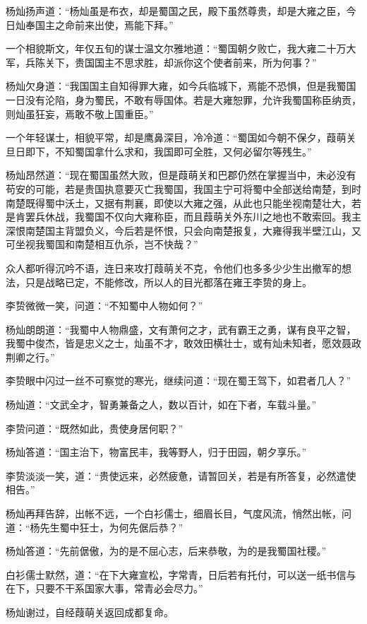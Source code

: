 杨灿扬声道：“杨灿虽是布衣，却是蜀国之民，殿下虽然尊贵，却是大雍之臣，今日灿奉国主之命前来出使，焉能下拜。”

一个相貌斯文，年仅五旬的谋士温文尔雅地道：“蜀国朝夕败亡，我大雍二十万大军，兵陈关下，贵国国主不思求胜，却派你这个使者前来，所为何事？”

杨灿欠身道：“我国国主自知得罪大雍，如今兵临城下，焉能不恐惧，但是我蜀国一日没有沦陷，身为蜀民，不敢有辱国体。若是大雍恕罪，允许我蜀国称臣纳贡，则灿虽狂妄，焉敢不敬上国重臣。”

一个年轻谋士，相貌平常，却是鹰鼻深目，冷冷道：“蜀国如今朝不保夕，葭萌关旦日即下，不知蜀国拿什么求和，我国即可全胜，又何必留尔等残生。”

杨灿昂然道：“现在蜀国虽然大败，但是葭萌关和巴郡仍然在掌握当中，未必没有苟安的可能，若是贵国执意要灭亡我蜀国，我国主宁可将蜀中全部送给南楚，到时南楚既得蜀中沃土，又据有荆襄，即使以大雍之强，从此也只能坐视南楚壮大，若是肯罢兵休战，我蜀国不仅向大雍称臣，而且葭萌关外东川之地也不敢索回。我主深恨南楚国主背盟负义，今后若是怀恨，只会向南楚报复，大雍得我半壁江山，又可坐视我蜀国和南楚相互仇杀，岂不快哉？”

众人都听得沉吟不语，连日来攻打葭萌关不克，令他们也多多少少生出撤军的想法，只是战略已定，不能修改，所以人的目光都落在雍王李贽的身上。

李贽微微一笑，问道：“不知蜀中人物如何？”

杨灿朗朗道：“我蜀中人物鼎盛，文有萧何之才，武有霸王之勇，谋有良平之智，我蜀中俊杰，皆是忠义之士，灿虽不才，敢效田横壮士，或有灿未知者，愿效聂政荆卿之行。”

李贽眼中闪过一丝不可察觉的寒光，继续问道：“现在蜀王驾下，如君者几人？”

杨灿道：“文武全才，智勇兼备之人，数以百计，如在下者，车载斗量。”

李贽问道：“既然如此，贵使身居何职？”

杨灿答道：“国主治下，物富民丰，我等野人，归于田园，朝夕享乐。”

李贽淡淡一笑，道：“贵使远来，必然疲惫，请暂回关，若是有所答复，必然遣使相告。”

杨灿再拜告辞，出帐不远，一个白衫儒士，细眉长目，气度风流，悄然出帐，问道：“杨先生蜀中狂士，为何先倨后恭？”

杨灿答道：“先前倨傲，为的是不屈心志，后来恭敬，为的是我蜀国社稷。”

白衫儒士默然，道：“在下大雍宣松，字常青，日后若有托付，可以送一纸书信与在下，只要不干系国家大事，常青必会尽力。”

杨灿谢过，自经葭萌关返回成都复命。

